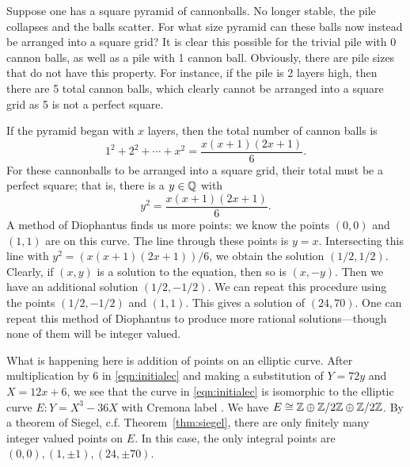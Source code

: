 \begin{ex}
Suppose one has a square pyramid of cannonballs. No longer stable, the pile collapses and the balls scatter. For what size pyramid can these balls now instead be arranged into a square grid? It is clear this possible for the trivial pile with 0 cannon balls, as well as a pile with 1 cannon ball. Obviously, there are pile sizes that do not have this property. For instance, if the pile is 2 layers high, then there are 5 total cannon balls, which clearly cannot be arranged into a square grid as 5 is not a perfect square. 

If the pyramid began with $x$ layers, then the total number of cannon balls is
	\[
	1^2 + 2^2 + \cdots + x^2= \dfrac{x(x + 1)(2x + 1)}{6}.
	\]
For these cannonballs to be arranged into a square grid, their total must be a perfect square; that is, there is a $y \in \mathbb{Q}$ with
	\begin{equation} \label{eqn:initialec}
	y^2= \dfrac{x(x + 1)(2x + 1)}{6}.
	\end{equation}
A method of Diophantus finds us more points: we know the points $(0,0)$ and $(1,1)$ are on this curve. The line through these points is $y= x$. Intersecting this line with $y^2= (x(x + 1)(2x + 1))/6$, we obtain the solution $(1/2,1/2)$. Clearly, if $(x,y)$ is a solution to the equation, then so is $(x,-y)$. Then we have an additional solution $(1/2,-1/2)$. We can repeat this procedure using the points $(1/2,-1/2)$ and $(1,1)$. This gives a solution of $(24,70)$. One can repeat this method of Diophantus to produce more rational solutions---though none of them will be integer valued. 

What is happening here is addition of points on an elliptic curve. After multiplication by 6 in \eqref{eqn:initialec} and making a substitution of $Y= 72y$ and $X= 12x + 6$, we see that the curve in \eqref{eqn:initialec} is isomorphic to the elliptic curve $E: Y= X^3 - 36X$ with Cremona label \fssht{}. We have $E \cong \mathbb{Z} \oplus \mathbb{Z}/2\mathbb{Z} \oplus \mathbb{Z}/2\mathbb{Z}$. By a theorem of Siegel, c.f. Theorem~\ref{thm:siegel}, there are only finitely many integer valued points on $E$. In this case, the only integral points are $(0,0), (1,\pm1), (24, \pm 70)$.
\end{ex}


